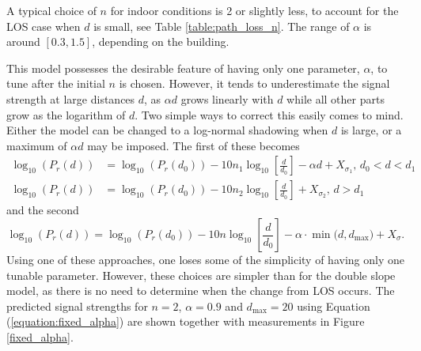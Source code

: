 \documentclass{LTHthesis}
\begin{document}
A typical choice of $n$ for indoor conditions is 2 or slightly less, to account for the LOS case when $d$ is small, see Table \ref{table:path_loss_n}. The range of $\alpha$ is around $[0.3,1.5]$, depending on the building.

This model possesses the desirable feature of having only one parameter, $\alpha$, to tune after the initial $n$ is chosen. However, it tends to underestimate the signal strength at large distances $d$, as $\alpha d$ grows linearly with $d$ while all other parts grow as the logarithm of $d$. Two simple ways to correct this easily comes to mind. Either the model can be changed to a log-normal shadowing when $d$ is large, or a maximum of $\alpha d $ may be imposed. The first of these becomes
%
\begin{subequations}
\begin{align}
\log_{10}({P_r(d)})&=\log_{10}({P_r(d_0)})-10n_1\log_{10}\left[{\frac{d}{d_0}}\right] -\alpha d+ X_{\sigma_1}, \hspace{2pt} d_0<d<d_1\\
\log_{10}({P_r(d)})&=\log_{10}({P_r(d_0)})-10n_2\log_{10}\left[{\frac{d}{d_0}}\right] + X_{\sigma_2}, \hspace{2pt} d>d_1
\end{align}
\end{subequations} 
and the second
\begin{equation}
\log_{10}({P_r(d)})=\log_{10}({P_r(d_0)})-10n\log_{10}\left[{\frac{d}{d_0}}\right] - \alpha\cdot\min({d, d_{\text{max}})}+ X_\sigma.
\label{equation:fixed_alpha}
\end{equation}
%
Using one of these approaches, one loses some of the simplicity of having only one tunable parameter. However, these choices are simpler than for the double slope model, as there is no need to determine when the change from LOS occurs. 
 The predicted signal strengths for $n=2$, $\alpha=0.9$ and $d_{\text{max}}=20$  using Equation (\ref{equation:fixed_alpha}) are shown together with measurements in Figure \ref{fixed_alpha}. 
\end{document}

